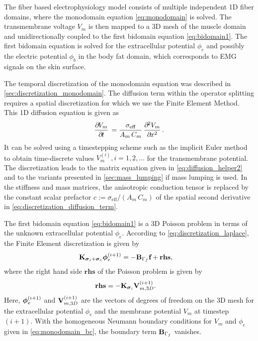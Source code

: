 The fiber based electrophysiology model consists of multiple independent 1D fiber domains, where the monodomain equation \cref{eq:monodomain} is solved. The transmembrane voltage $V_m$ is then mapped to a 3D mesh of the muscle domain and unidirectionally coupled to the first bidomain equation \cref{eq:bidomain1}. The first bidomain equation is solved for the extracellular potential $\phi_e$ and possibly the electric potential $\phi_b$ in the body fat domain, which corresponds to EMG signals on the skin surface.

The temporal discretization of the monodomain equation was described in \cref{sec:discretization_monodomain}. The diffusion term within the operator splitting requires a spatial discretization for which we use the Finite Element Method. This 1D diffusion equation is given as
\begin{align}\label{eq:discretization_diffusion_term}
  \p{V_m}{t} = \dfrac{\sigma_\text{eff}}{A_m\,C_m} \p{V_m}{x}{2}.
\end{align}
It can be solved using a timestepping scheme such as the implicit Euler method to obtain time-discrete values $V_m^{(i)}, i=1,2,\dots$ for the transmembrane potential. The discretization leads to the matrix equation given in \cref{eq:diffusion_helper2} and to the variants presented in \cref{sec:mass_lumping} if mass lumping is used. In the stiffness and mass matrices, the anisotropic conduction tensor is replaced by the constant scalar prefactor $c := \sigma_\text{eff}/(A_m\,C_m)$ of the spatial second derivative in \cref{eq:discretization_diffusion_term}.

The first bidomain equation \cref{eq:bidomain1} is a 3D Poisson problem in terms of the unknown extracellular potential $\phi_e$. According to \cref{eq:discretization_laplace}, the Finite Element discretization is given by%
\begin{align*}
  \textbf{K}_{\boldsymbol{\sigma}_i + \boldsymbol{\sigma}_e} \boldsymbol{\phi}_e^{(i+1)} &= - \textbf{B}_{\Gamma_f}\textbf{f} + \textbf{rhs},
\end{align*}
where the right hand side $\textbf{rhs}$ of the Poisson problem is given by
\begin{align*}
  \textbf{rhs} &= -\textbf{K}_{\boldsymbol{\sigma}_i} \textbf{V}_{m,3D}^{(i+1)}.
\end{align*}
Here, $\boldsymbol{\phi}_e^{(i+1)}$ and $\textbf{V}_{m,3D}^{(i+1)}$ are the vectors of degrees of freedom on the 3D mesh for the extracellular potential $\phi_e$ and the membrane potential $V_m$ at timestep $(i+1)$. With the homogeneous Neumann boundary conditions for $V_m$ and $\phi_e$ given in \cref{eq:monodomain_bc}, the boundary term $\textbf{B}_{\Gamma_f}$ vanishes.

